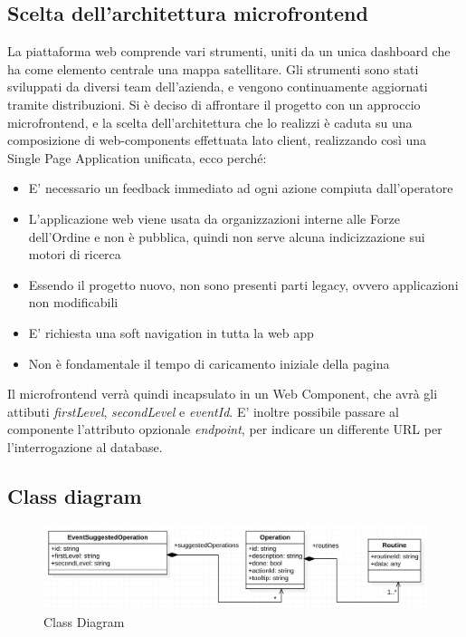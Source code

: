 \subsection{Scelta dell'architettura microfrontend}
La piattaforma web comprende vari strumenti, uniti da un unica dashboard che ha come elemento centrale una 
mappa satellitare. Gli strumenti sono stati sviluppati da diversi team dell'azienda, e vengono continuamente
aggiornati tramite distribuzioni. Si è deciso di affrontare il progetto con un approccio microfrontend,
e la scelta dell'architettura che lo realizzi è caduta su una composizione di web-components effettuata
lato client, realizzando così una Single Page Application unificata, ecco perché:
\begin{itemize}
    \item E' necessario un feedback immediato ad ogni azione compiuta dall'operatore
    \item L'applicazione web viene usata da organizzazioni interne alle Forze dell'Ordine 
    e non è pubblica, quindi non serve alcuna indicizzazione sui motori di ricerca
    \item Essendo il progetto nuovo, non sono presenti parti legacy, ovvero applicazioni non modificabili 
    \item E' richiesta una soft navigation in tutta la web app
    \item Non è fondamentale il tempo di caricamento iniziale della pagina 
\end{itemize}


Il microfrontend verrà quindi incapsulato in un Web Component, che avrà gli attibuti \emph{firstLevel}, \emph{secondLevel} e \emph{eventId}.
E' inoltre possibile passare al componente l'attributo opzionale \emph{endpoint}, per indicare un differente URL per l'interrogazione al database.

\pagebreak
\subsection{Class diagram}

\begin{figure}[H]
    \centering
    \includegraphics[width=150mm]{img/class_diagram}
    \caption{Class Diagram}
  \end{figure}


